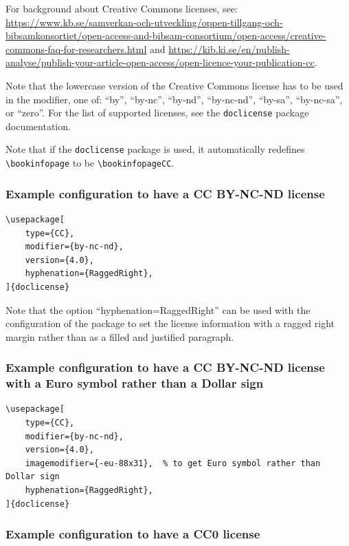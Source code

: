 \documentclass[12pt, twoside]{article}
\begin{document}
For background about Creative Commons licenses, see:
\url{https://www.kb.se/samverkan-och-utveckling/oppen-tillgang-och-bibsamkonsortiet/open-access-and-bibsam-consortium/open-access/creative-commons-faq-for-researchers.html} and \url{https://kib.ki.se/en/publish-analyse/publish-your-article-open-access/open-licence-your-publication-cc}.

Note that the lowercase version of the Creative Commons license has to be used in the modifier, \ie one of: \enquote{by}, \enquote{by-nc}, \enquote{by-nd}, \enquote{by-nc-nd}, \enquote{by-sa}, \enquote{by-nc-sa}, or \enquote{zero}. For the list of supported licenses, see the \texttt{doclicense} package documentation.

Note that if the \texttt{doclicense} package is used, it automatically redefines \texttt{\textbackslash bookinfopage} to be \texttt{\textbackslash bookinfopageCC}.

\subsubsection{Example configuration to have a CC BY-NC-ND license}

\begin{lstlisting}[style=latexExampleForAuthors]
\usepackage[
    type={CC},
    modifier={by-nc-nd},
    version={4.0},
    hyphenation={RaggedRight},
]{doclicense}
\end{lstlisting}

Note that the option \enquote{hyphenation={RaggedRight}} can be used with the configuration of the package to set the license information with a ragged right margin rather than as a filled and justified paragraph.

\subsubsection{Example configuration to have a CC BY-NC-ND license with a Euro symbol rather than a Dollar sign}

\begin{lstlisting}[style=latexExampleForAuthors]
\usepackage[
    type={CC},
    modifier={by-nc-nd},
    version={4.0},
    imagemodifier={-eu-88x31},  % to get Euro symbol rather than Dollar sign
    hyphenation={RaggedRight},
]{doclicense}
\end{lstlisting}

\subsubsection{Example configuration to have a CC0 license}
\end{document}
